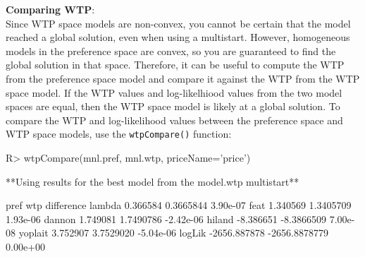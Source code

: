 \documentclass[article]{jss}
\begin{document}
\textbf{Comparing WTP}:\\
Since WTP space models are non-convex, you cannot be certain that the
model reached a global solution, even when using a multistart. However,
homogeneous models in the preference space are convex, so you are
guaranteed to find the global solution in that space. Therefore, it can
be useful to compute the WTP from the preference space model and compare
it against the WTP from the WTP space model. If the WTP values and
log-likelhiood values from the two model spaces are equal, then the WTP
space model is likely at a global solution. To compare the WTP and
log-likelihood values between the preference space and WTP space models,
use the \texttt{wtpCompare()} function:

\begin{CodeChunk}

\begin{CodeInput}
R> wtpCompare(mnl.pref, mnl.wtp, priceName='price')
\end{CodeInput}

\begin{CodeOutput}
**Using results for the best model from the model.wtp multistart**
\end{CodeOutput}

\begin{CodeOutput}
                pref           wtp difference
lambda      0.366584     0.3665844   3.90e-07
feat        1.340569     1.3405709   1.93e-06
dannon      1.749081     1.7490786  -2.42e-06
hiland     -8.386651    -8.3866509   7.00e-08
yoplait     3.752907     3.7529020  -5.04e-06
logLik  -2656.887878 -2656.8878779   0.00e+00
\end{CodeOutput}
\end{CodeChunk}


\end{document}
